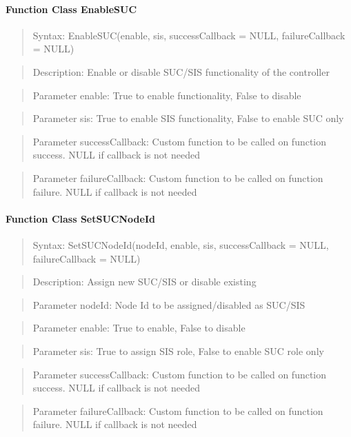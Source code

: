 \paragraph{Function Class EnableSUC}
\begin{quote}Syntax: EnableSUC(enable, sis, successCallback = NULL, failureCallback = NULL)\end{quote}
\begin{quote}Description: Enable or disable SUC/SIS functionality of the controller\end{quote}
\begin{quote}Parameter enable: True to enable functionality, False to disable\end{quote}
\begin{quote}Parameter sis: True to enable SIS functionality, False to enable SUC only\end{quote}
\begin{quote}Parameter successCallback: Custom function to be called on function success. NULL if callback is not needed\end{quote}
\begin{quote}Parameter failureCallback: Custom function to be called on function failure. NULL if callback is not needed\end{quote}


\paragraph{Function Class SetSUCNodeId}
\begin{quote}Syntax: SetSUCNodeId(nodeId, enable, sis, successCallback = NULL, failureCallback = NULL)\end{quote}
\begin{quote}Description: Assign new SUC/SIS or disable existing\end{quote}
\begin{quote}Parameter nodeId: Node Id to be assigned/disabled as SUC/SIS\end{quote}
\begin{quote}Parameter enable: True to enable, False to disable\end{quote}
\begin{quote}Parameter sis: True to assign SIS role, False to enable SUC role only\end{quote}
\begin{quote}Parameter successCallback: Custom function to be called on function success. NULL if callback is not needed\end{quote}
\begin{quote}Parameter failureCallback: Custom function to be called on function failure. NULL if callback is not needed\end{quote}


